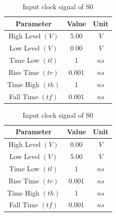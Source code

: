 \documentclass[a4paper,12pt]{article}
\begin{document}
\begin{table}[H]
			\begin{subtable}[t]{0.48\textwidth} %
				\centering
				\begin{tabular}{|c|c|c|}
					\hline
					\textbf{Parameter}          & \textbf{Value} & \textbf{Unit} \\ \hline
					High Level $(V)$            & 5.00           & $V$           \\ \hline
					Low Level $(V)$             & 0.00           & $V$           \\ \hline
					Time Low $(tl)$             & 1        & $ns$          \\ \hline
					Rise Time $(tr)$            & 0.001          & $ns$          \\ \hline
					Time High $(th)$            & 1          & $ns$          \\ \hline
					Fall Time $(tf)$            & 0.001          & $ns$          \\ \hline
				\end{tabular}
				
				\caption{Input clock signal of S0} %
			\end{subtable}
			\hfil
			\begin{subtable}[t]{0.48\textwidth} %
				\centering
				\begin{tabular}{|c|c|c|}
					\hline
					\textbf{Parameter}          & \textbf{Value} & \textbf{Unit} \\ \hline
					High Level $(V)$            & 0.00           & $V$           \\ \hline
					Low Level $(V)$             & 5.00           & $V$           \\ \hline
					Time Low $(tl)$             & 1          & $ns$          \\ \hline
					Rise Time $(tr)$            & 0.001          & $ns$          \\ \hline
					Time High $(th)$            & 1        & $ns$          \\ \hline
					Fall Time $(tf)$            & 0.001         & $ns$          \\ \hline
				\end{tabular}
				

\end{subtable}
\end{table}
\end{document}
